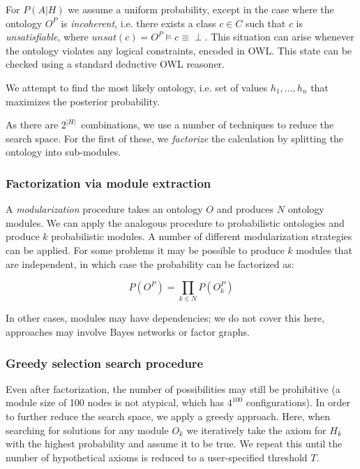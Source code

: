 \documentclass{my}
\newcommand{\eqnlabel}[1]{\label{eqn:#1}}
\begin{document}
For $P(A|H)$ we assume a uniform probability, except in the case
where the ontology $O^P$ is \emph{incoherent}, i.e. there exists a
class $c \in C$ such that $c$ is \emph{unsatisfiable}, where $unsat(c)
= O^P \vDash c \equiv \perp$. This situation can arise whenever the
ontology violates any logical constraints, encoded in OWL.  This state
can be checked using a standard deductive OWL reasoner.

We attempt to find the most likely ontology, i.e. set of values
$h_1,...,h_n$ that maximizes the posterior probability.

As there are $2^{|H|}$\ combinations, we use a number of techniques
to reduce the search space. For the first of these, we \emph{factorize}
the calculation by splitting the ontology into sub-modules.

\subsubsection{Factorization via module extraction}

A \emph{modularization} procedure takes an ontology $O$ and produces
$N$ ontology modules. We can apply the analogous procedure to
probabilistic ontologies and produce $k$ probabilistic modules. A
number of different modularization strategies can be applied. For some
problems it may be possible to produce $k$ modules that are
independent, in which case the probability can be factorized as:

\begin{equation}
P(O^P) = \prod_{k \in N}P(O^P_k)
\eqnlabel{Factorization}
\end{equation}

In other cases, modules may have dependencies; we do not cover this
here, approaches may involve Bayes networks or factor graphs.

\subsubsection{Greedy selection search procedure}

Even after factorization, the number of possibilities may still be
prohibitive (a module size of 100 nodes is not atypical, which has $4^100$ configurations).
In order to further reduce the search space, we apply a
greedy approach. Here, when searching for solutions for any module
$O_k$ we iteratively take the axiom for $H_k$ with the highest
probability and assume it to be true. We repeat this until the number
of hypothetical axioms is reduced to a user-specified threshold $T$.
\end{document}
